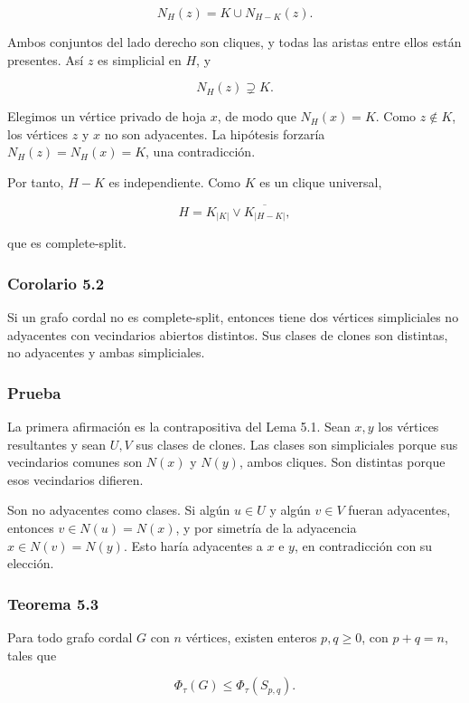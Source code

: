 \documentclass[
  11pt,
]{article}
\begin{document}
\[
N_H(z)=K\cup N_{H-K}(z).
\]

Ambos conjuntos del lado derecho son cliques, y todas las aristas entre
ellos están presentes. Así \(z\) es simplicial en \(H\), y

\[
N_H(z)\supsetneq K.
\]

Elegimos un vértice privado de hoja \(x\), de modo que \(N_H(x)=K\).
Como \(z\notin K\), los vértices \(z\) y \(x\) no son adyacentes. La
hipótesis forzaría \(N_H(z)=N_H(x)=K\), una contradicción.

Por tanto, \(H-K\) es independiente. Como \(K\) es un clique universal,

\[
H=K_{|K|}\vee\overline{K_{|H-K|}},
\]

que es complete-split.

\subsubsection{Corolario 5.2}\label{corolario-5.2}

Si un grafo cordal no es complete-split, entonces tiene dos vértices
simpliciales no adyacentes con vecindarios abiertos distintos. Sus
clases de clones son distintas, no adyacentes y ambas simpliciales.

\subsubsection{Prueba}\label{prueba-6}

La primera afirmación es la contrapositiva del Lema 5.1. Sean \(x,y\)
los vértices resultantes y sean \(U,V\) sus clases de clones. Las clases
son simpliciales porque sus vecindarios comunes son \(N(x)\) y \(N(y)\),
ambos cliques. Son distintas porque esos vecindarios difieren.

Son no adyacentes como clases. Si algún \(u\in U\) y algún \(v\in V\)
fueran adyacentes, entonces \(v\in N(u)=N(x)\), y por simetría de la
adyacencia \(x\in N(v)=N(y)\). Esto haría adyacentes a \(x\) e \(y\), en
contradicción con su elección.

\subsubsection{Teorema 5.3}\label{teorema-5.3}

Para todo grafo cordal \(G\) con \(n\) vértices, existen enteros
\(p,q\ge0\), con \(p+q=n\), tales que

\[
\boxed{
\Phi_\tau(G)\le\Phi_\tau(S_{p,q}).
}
\]
\end{document}
